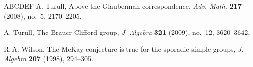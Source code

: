 \documentclass[12pt]{amsart}
\theoremstyle{plain}
\theoremstyle{definition}
\numberwithin{equation}{section}
\begin{document}
\begin{thebibliography}{ABCDEF}
A. Turull, Above the Glauberman correspondence, {\em Adv. Math.} {\bf 217} (2008), no.~5, 2170--2205.

A. Turull, The Brauer-Clifford group, {\em J. Algebra} {\bf 321}
(2009), no.~12, 3620--3642.



R.\,A. Wilson, The McKay conjecture is true for the sporadic simple
groups, \emph{J. Algebra} \textbf{207} (1998), 294--305.

 \end{thebibliography}
\end{document}
